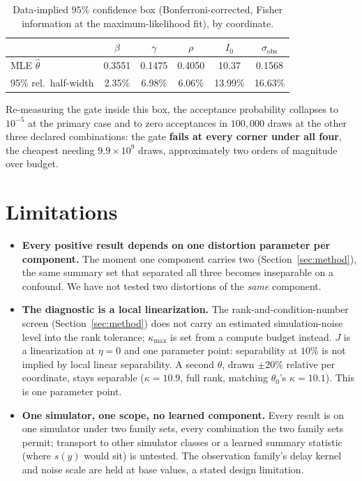 \documentclass{article}
\begin{document}
\begin{table}[h]
\centering
\footnotesize
\setlength{\tabcolsep}{4pt}
\begin{tabular}{lccccc}
\toprule
 & $\beta$ & $\gamma$ & $\rho$ & $I_0$ & $\sigma_{\text{obs}}$ \\
\midrule
MLE $\hat\theta$ & 0.3551 & 0.1475 & 0.4050 & 10.37 & 0.1568 \\
95\% rel.\ half-width & 2.35\% & 6.98\% & 6.06\% & 13.99\% & 16.63\% \\
\bottomrule
\end{tabular}
\caption{Data-implied $95\%$ confidence box (Bonferroni-corrected, Fisher information at the
maximum-likelihood fit), by coordinate.}
\label{tab:confidence-box}
\end{table}

Re-measuring the gate inside this box, the
acceptance probability collapses to $10^{-5}$ at the primary case and to zero acceptances in
$100{,}000$ draws at the other three declared combinations: the gate \textbf{fails at every
corner under all four}, the
cheapest needing $9.9\times10^9$ draws, approximately two orders of magnitude over budget.

\enlargethispage{6\baselineskip}
\section{Limitations}
\label{sec:limitations}

\begin{itemize}[topsep=1pt,itemsep=0pt,parsep=0pt,leftmargin=*]
\item \textbf{Every positive result depends on one distortion parameter per component.} The
moment one component carries two (Section~\ref{sec:method}), the same summary set that
separated all three becomes inseparable on a confound. We have not tested two distortions of
the \emph{same} component.
\item \textbf{The diagnostic is a local linearization.} The rank-and-condition-number
screen (Section~\ref{sec:method}) does not carry an estimated simulation-noise level into the
rank tolerance; $\kappa_{\max}$ is set from a compute budget instead. $J$ is a linearization at
$\eta=0$ and one parameter point: separability at $10\%$ is not implied by local linear
separability. A second $\theta$, drawn $\pm20\%$ relative per coordinate, stays separable
($\kappa=10.9$, full rank, matching $\theta_0$'s $\kappa=10.1$). This is one parameter point.
\item \textbf{One simulator, one scope, no learned component.} Every result is on one simulator
under two family sets, every combination the two family sets permit; transport to
other simulator classes or a learned summary statistic (where $s(y)$ would sit) is untested.
The observation family's delay kernel and noise scale are held at base values, a stated design
limitation.
\end{itemize}
\end{document}
